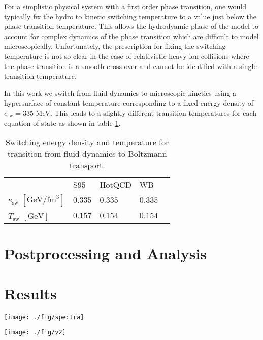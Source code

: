 \documentclass[aps,prc,reprint,amsmath,nofootinbib,superscriptaddress]{revtex4-1}
\begin{document}
For a simplistic physical system with a first order phase transition, one would typically fix the hydro to kinetic switching temperature to a value just below the phase transition temperature. 
This allows the hydrodyamic phase of the model to account for complex dynamics of the phase transition which are difficult to model microscopically. 
Unfortunately, the prescription for fixing the switching temperature is not so clear in the case of relativistic heavy-ion collisions where the phase transition is a smooth cross over and cannot be identified with a single transition temperature. 

In this work we switch from fluid dynamics to microscopic kinetics using a hypersurface of constant temperature corresponding to a fixed energy density of $e_\text{sw}= 335$ MeV. 
This leads to a slightly different transition temperatures for each equation of state as shown in table \ref{tab:tsw}.

\begin{table}
  \caption{
    \label{tab:tsw}
    Switching energy density and temperature for transition from fluid dynamics to Boltzmann transport.
  }
  \begin{ruledtabular}
  \begin{tabular}{lllll}
    & S95 & HotQCD & WB & \\
    \noalign{\smallskip}\hline\noalign{\smallskip}
    $e_\text{sw}$ $[\text{GeV}/\text{fm}^3]$ & $0.335$ & $0.335$ & $0.335$ &  \\
    $T_\text{sw}$ $[\text{GeV}]$ & $0.157$ & $0.154$ & $0.154$ & \\
  \end{tabular}
  \end{ruledtabular}
\end{table}


\section{Postprocessing and Analysis}

\section{Results}

\begin{figure*}[t]
  \texttt{[image: ./fig/spectra]}
  \caption{
    \label{fig:spectra}
  }
\end{figure*}

\begin{figure*}[t]
  \texttt{[image: ./fig/v2]}
  \caption{
    \label{fig:spectra}
  }
\end{figure*}
\end{document}
